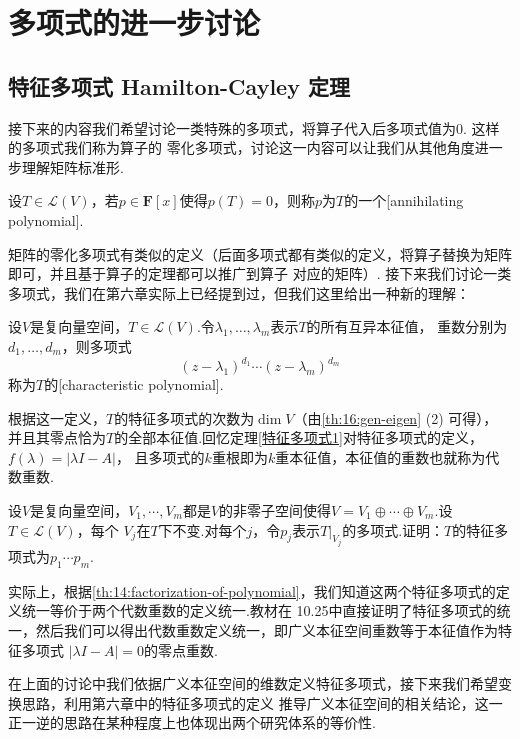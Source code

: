 \chapter{多项式的进一步讨论}

\section{特征多项式 \quad Hamilton-Cayley 定理}
接下来的内容我们希望讨论一类特殊的多项式，将算子代入后多项式值为0. 这样的多项式我们称为算子的
零化多项式，讨论这一内容可以让我们从其他角度进一步理解矩阵标准形.
\begin{definition}
    设$T\in \mathcal{L}(V)$，若$p\in\mathbf{F}[x]$使得$p(T)=0$，则称$p$为$T$的一个[annihilating polynomial].
\end{definition}
矩阵的零化多项式有类似的定义（后面多项式都有类似的定义，将算子替换为矩阵即可，并且基于算子的定理都可以推广到算子
对应的矩阵）. 接下来我们讨论一类多项式，我们在第六章实际上已经提到过，但我们这里给出一种新的理解：
\begin{definition}
    设$V$是复向量空间，$T\in \mathcal{L}(V)$.令$\lambda_1,\ldots,\lambda_m$表示$T$的所有互异本征值，
    重数分别为$d_1,\ldots,d_m$，则多项式\[(z-\lambda_1)^{d_1}\cdots(z-\lambda_m)^{d_m}\]
    称为$T$的[characteristic polynomial].
\end{definition}
根据这一定义，$T$的特征多项式的次数为$\dim V$（由\autoref{th:16:gen-eigen} (2) 可得）， %
并且其零点恰为$T$的全部本征值.回忆定理\ref{特征多项式1}对特征多项式的定义，$f(\lambda)=|\lambda I-A|$，
且多项式的$k$重根即为$k$重本征值，本征值的重数也就称为代数重数.
\begin{example}
    设$V$是复向量空间，$V_1,\cdots,V_m$都是$V$的非零子空间使得$V=V_1\oplus\cdots\oplus V_m$.设$T\in \mathcal{L}(V)$，每个
    $V_j$在$T$下不变.对每个$j$，令$p_j$表示$T|_{V_j}$的多项式.证明：$T$的特征多项式为$p_1\cdots p_m$.
\end{example}
实际上，根据\autoref{th:14:factorization-of-polynomial}，我们知道这两个特征多项式的定义统一等价于两个代数重数的定义统一.教材在
10.25中直接证明了特征多项式的统一，然后我们可以得出代数重数定义统一，即广义本征空间重数等于本征值作为特征多项式
$|\lambda I-A|=0$的零点重数.

在上面的讨论中我们依据广义本征空间的维数定义特征多项式，接下来我们希望变换思路，利用第六章中的特征多项式的定义
推导广义本征空间的相关结论，这一正一逆的思路在某种程度上也体现出两个研究体系的等价性.

